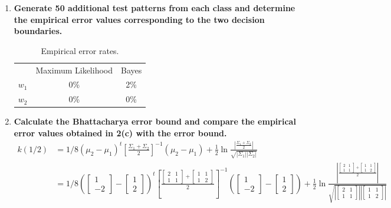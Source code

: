 \documentclass[12pt]{article}
\begin{document}
\begin{enumerate}
\begin{enumerate}
\begin{figure}[H]
    \end{figure}
  \item \textbf{Generate 50 additional test patterns from each class and determine the empirical error values corresponding to the two decision boundaries.}
    \begin{table}[H]
    \centering
    \begin{tabular}{lcc}
      & Maximum Likelihood & Bayes \\
      $w_1$ & 0\% & 2\% \\
      $w_2$ & 0\% & 0\% \\
    \end{tabular}
    \caption{Empirical error rates.}
    \end{table}
  \item \textbf{Calculate the Bhattacharya error bound and compare the empirical error values obtained in 2(c) with the error bound.}
    \begin{equation}
    \begin{split}
      k(1/2)& = 1/8(\mu_2-\mu_1)^t\left[\frac{\Sigma_1+\Sigma_2}{2}\right]^{-1}(\mu_2-\mu_1)+\frac{1}{2} \ln\frac{|\frac{\Sigma_1+\Sigma_2}{2}|}{\sqrt{|\Sigma_1||\Sigma_2|}} \\
      & = 1/8([\begin{array}{c}1\\-2\end{array}]-[\begin{array}{c}1\\2\end{array}])^t\left[\frac{[\begin{array}{cc}2&1\\1&1\end{array}]+[\begin{array}{cc}1&1\\1&2\end{array}]}{2}\right]^{-1}([\begin{array}{c}1\\-2\end{array}]-[\begin{array}{c}1\\2\end{array}])+\frac{1}{2} \ln\frac{|\frac{[\begin{array}{cc}2&1\\1&1\end{array}]+[\begin{array}{cc}1&1\\1&2\end{array}]}{2}|}{\sqrt{|[\begin{array}{cc}2&1\\1&1\end{array}]||[\begin{array}{cc}1&1\\1&2\end{array}]|}} \\

\end{split}
\end{equation}
\end{enumerate}
\end{enumerate}
\end{document}
